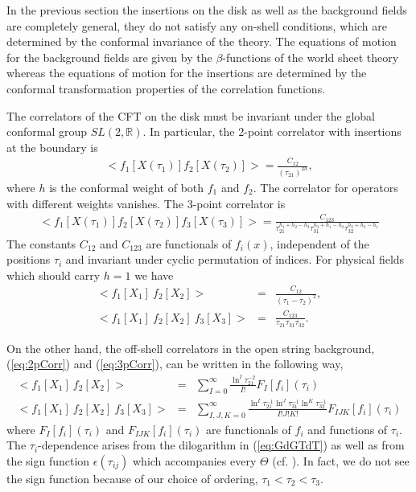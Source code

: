 \documentclass[a4paper,11pt]{article}               \def\new#1\endnew{{\bf #1}}
\newcommand {\bbR}{\mathbb{R}}
\begin{document}
In the previous section the insertions on the disk as well as the 
background fields are completely general, they do not satisfy
any on-shell conditions, which are determined by the conformal
invariance of the theory. The equations of motion for the 
background fields are given by
the $\beta$-functions of the world sheet theory whereas
the equations of motion for the insertions are determined by the 
conformal transformation properties of the correlation functions.

The correlators of the CFT on the disk must be invariant under 
the global conformal group $SL(2,\bbR)$. In particular, the
2-point correlator with insertions
at the boundary is
\begin{eqnarray}
  \label{eq:CFT2point}
  <f_1[X(\tau_1)] f_2[X(\tau_2)]> =  \frac {C_{12}}{(\tau_{21})^{2h}},
\end{eqnarray}
where $h$ is the conformal weight of both $f_1$ and $f_2$.
The correlator for operators with different weights vanishes.
The 3-point correlator is
\begin{eqnarray}
  \label{eq:CFT3point}
   <f_1[X(\tau_1)] f_2[X(\tau_2)] f_3[X(\tau_3)]> =
   \frac {C_{123}}
   {\tau_{21}^{h_1+h_2-h_3}\tau_{31}^{h_3+h_1-h_2}\tau_{32}^{h_2+h_3-h_1}}
\end{eqnarray}
The constants $C_{12}$ and $C_{123}$ are functionals of $f_i(x)$,
independent of the positions $\tau_i$ and invariant under cyclic permutation
of indices. For physical fields which should carry $h = 1$ we have
\begin{eqnarray}
  \label{eq:CFT2corrh1}
  <f_1[X_1]~f_2[X_2]> &=&  \frac {C_{12}}{(\tau_1 - \tau_2)^{2}},
\\
  \label{eq:CFT3corrh1}
  <f_1[X_1]~f_2[X_2]~f_3[X_3]> &=&
  \frac {C_{123}}{\tau_{21}\tau_{31}\tau_{32}}.
\end{eqnarray}

On the other hand, the off-shell correlators
in the open string background, (\ref{eq:2pCorr}) and (\ref{eq:3pCorr}),
can be written in the following way,
\begin{eqnarray}
  \label{eq:2pointoff}
  <f_1[X_1]~f_2[X_2]> &=&
  \sum _{I=0}^{\infty} \frac {\ln^I\tau_{21}^{-2}}{I!}  F_I[f_i](\tau_i)
\\
  <f_1[X_1]~f_2[X_2]~f_3[X_3]> &=&
  \sum _{I,J,K=0}^{\infty}
  \frac{\ln^I\tau_{21}^{-1}\ln^J\tau_{31}^{-1}\ln^K\tau_{32}^{-1}}{I!J!K!} 
  F_{IJK}[f_i](\tau_i)
\nonumber
\end{eqnarray}
where $F_I[f_i](\tau_i)$ and $F_{IJK}[f_i](\tau_i)$ are functionals of
$f_i$ and functions of $\tau_i$. The $\tau_i$-dependence arises from
the dilogarithm in (\ref{eq:GdGTdT}) as well as from the sign
function $\epsilon(\tau_{ij})$ which
accompanies every $\Theta$ (cf. \cite{Herbst:2001ai}). 
In fact, we do not see the sign function
because of our choice of ordering, $\tau_1 < \tau_2 < \tau_3$.
\end{document}
